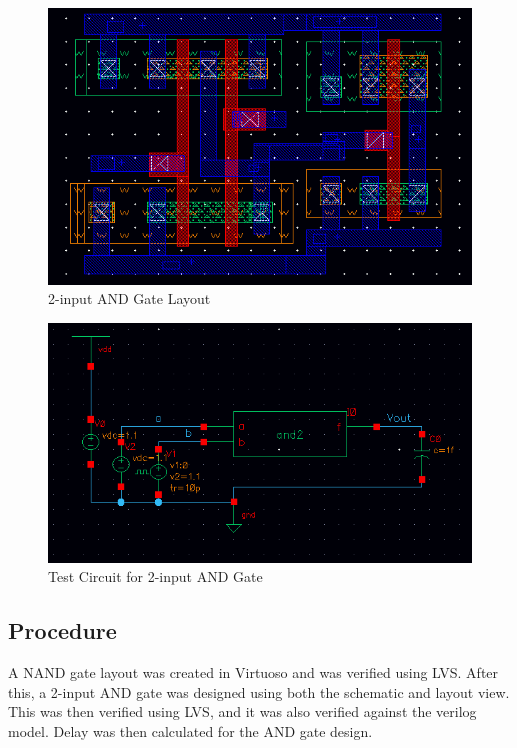 \documentclass[12pt]{article}
\begin{document}
\begin{figure}[H]
\centering
\includegraphics[width=\linewidth]{and2-layout}
\caption{2-input AND Gate Layout}
\label{fig:and2-layout}
\end{figure}


\begin{figure}
\centering
\includegraphics[width=\linewidth]{and2-test-circuit}
\caption{Test Circuit for 2-input AND Gate}
\label{fig:and2-test-circuit}
\end{figure}



\subsection{Procedure}
A NAND gate  layout was created in Virtuoso and was verified using LVS. After this, a 2-input AND gate was designed using both the schematic and layout view. This was then verified using LVS, and it was also verified against the verilog model. Delay was then calculated for the AND gate design.
\end{document}
